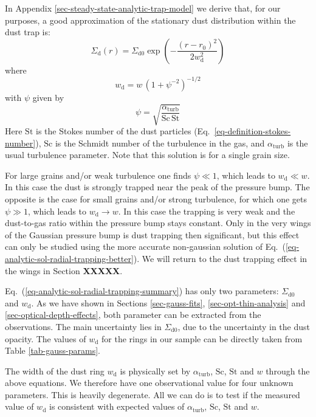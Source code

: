 \documentclass{aa}
\begin{document}
In Appendix \ref{sec-steady-state-analytic-trap-model} we derive that, for our
purposes, a good approximation of the stationary dust distribution within the
dust trap is:
\begin{equation}\label{eq-analytic-sol-radial-trapping-summary}
\Sigma_{\mathrm{d}}(r) = \Sigma_{\mathrm{d0}} \exp\left(-\frac{(r-r_0)^2}{2w_{\mathrm{d}}^2}\right)
\end{equation}
where
\begin{equation}\label{eq-wd-afo-w-psi}
  w_{\mathrm{d}} = w\,\left(1+\psi^{-2}\right)^{-1/2}
\end{equation}
with $\psi$ given by
\begin{equation}\label{eq-psi-afo-alpha-sc-st}
\psi = \sqrt{\frac{\alpha_{\mathrm{turb}}}{\mathrm{Sc}\,\mathrm{St}}}
\end{equation}
Here $\mathrm{St}$ is the Stokes number of the dust particles
(Eq.~\ref{eq-definition-stokes-number}), $\mathrm{Sc}$ is the Schmidt number of
the turbulence in the gas, and $\alpha_{\mathrm{turb}}$ is the usual turbulence
parameter. Note that this solution is for a single grain size.

For large grains and/or weak turbulence one finds $\psi\ll 1$, which leads to
$w_{\mathrm{d}}\ll w$. In this case the dust is strongly trapped near the peak
of the pressure bump. The opposite is the case for small grains and/or strong
turbulence, for which one gets $\psi\gg 1$, which leads to
$w_{\mathrm{d}}\rightarrow w$. In this case the trapping is very weak and the
dust-to-gas ratio within the pressure bump stays constant. Only in the very
wings of the Gaussian pressure bump is dust trapping then significant, but this
effect can only be studied using the more accurate non-gaussian solution of
Eq.~(\ref{eq-analytic-sol-radial-trapping-better}). We will return to the dust
trapping effect in the wings in Section {\bf XXXXX}.

Eq.~(\ref{eq-analytic-sol-radial-trapping-summary}) has only two parameters:
$\Sigma_{\mathrm{d0}}$ and $w_{\mathrm{d}}$. As we have shown in Sections
\ref{sec-gauss-fits}, \ref{sec-opt-thin-analysis} and
\ref{sec-optical-depth-effects}, both parameter can be extracted from the
observations. The main uncertainty lies in $\Sigma_{\mathrm{d0}}$, due to the
uncertainty in the dust opacity. The values of $w_{\mathrm{d}}$ for the rings in
our sample can be directly taken from Table \ref{tab-gauss-params}.

The width of the dust ring $w_{\mathrm{d}}$ is physically set by
$\alpha_{\mathrm{turb}}$, $\mathrm{Sc}$, $\mathrm{St}$ and $w$ through the above
equations. We therefore
have one observational value for four unknown parameters. This is heavily
degenerate. All we can do is to test if the measured value of
$w_{\mathrm{d}}$ is consistent with expected values of $\alpha_{\mathrm{turb}}$,
$\mathrm{Sc}$, $\mathrm{St}$ and $w$.
\end{document}
